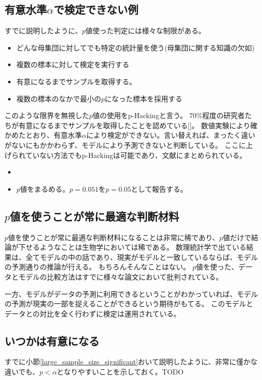 \subsection{有意水準$\alpha$で検定できない例}
すでに説明したように、$p$値使った判定には様々な制限がある。

\begin{itemize}
  \item どんな母集団に対してでも特定の統計量を使う(母集団に関する知識の欠如)
  \item 複数の標本に対して検定を実行する
  \item 有意になるまでサンプルを取得する。
  \item 複数の標本のなかで最小の$p$になった標本を採用する
\end{itemize}

このような限界を無視した$p$値の使用をp-Hackingと言う。
$70\%$程度の研究者たちが有意になるまでサンプルを取得したことを認めている[\cite{john2012measuring}]。
数値実験により確かめたとおり、有意水準$\alpha$により検定ができない。言い替えれば、まったく違いがないにもかかわらず、モデルにより予測できないと判断している。
ここに上げられていない方法でもp-Hackingは可能であり、文献\cite{stefan2023big}にまとめられている。

\begin{itemize}
  \item 
  \item $p$値をまるめる。$p=0.051$を$p=0.05$として報告する。
\end{itemize}
\fi

\subsection{$p$値を使うことが常に最適な判断材料}
$p$値を使うことが常に最適な判断材料になることは非常に稀であり、$p$値だけで結論が下せるようなことは生物学においては稀である。
数理統計学で出ている結果は、全てモデルの中の話であり、現実がモデルと一致しているならば、モデルの予測通りの推論が行える。
もちろんそんなことはない。
$p$値を使った、データとモデルの比較方法はすでに様々な論文において批判されている\cite{points_of_significance}。

一方、モデルがデータの予測に利用できるということがわかっていれば、モデルの予測が現実の一部を捉えることができるという期待がもてる。
このモデルとデータとの対比を全く行わずに検定は運用されている。

\subsection{いつかは有意になる}
すでに小節\ref{large_sample_size_significant}おいて説明したように、非常に僅かな違いでも、$p<\alpha$となりやすいことを示しておく。TODO
\fi


